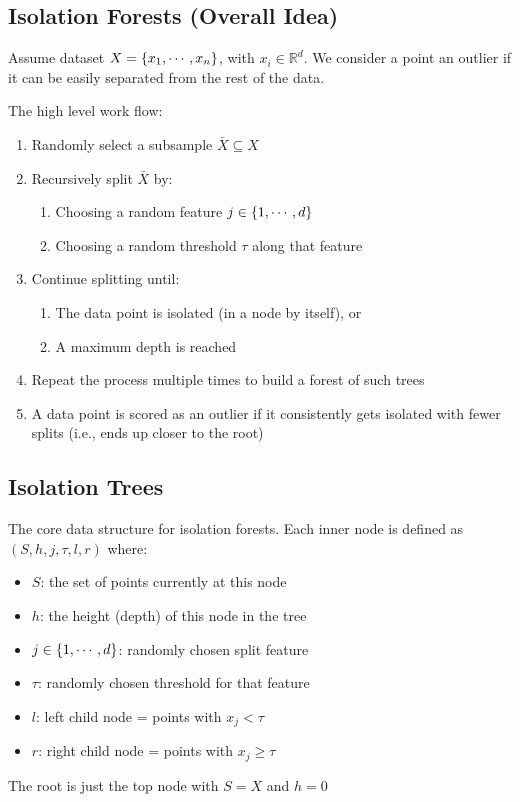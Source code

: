 \documentclass{article}
\begin{document}
\subsection*{Isolation Forests (Overall Idea)}
Assume dataset $X = \{x_1, \cdots, x_n\}$, with $x_i \in \mathbb{R}^d$. We consider a point an outlier if it can be easily separated from the rest of the data.

The high level work flow:
\begin{enumerate}
    \item Randomly select a subsample $\bar{X} \subseteq X$
    \item Recursively split $\bar{X}$ by:
    \begin{enumerate}
        \item Choosing a random feature $j \in \{1, \cdots, d\}$
        \item Choosing a random threshold $\tau$ along that feature
    \end{enumerate}
    \item Continue splitting until:
    \begin{enumerate}
        \item The data point is isolated (in a node by itself), or
        \item A maximum depth is reached
    \end{enumerate}
    \item Repeat the process multiple times to build a forest of such trees
    \item A data point is scored as an outlier if it consistently gets isolated with fewer splits (i.e., ends up closer to the root)
\end{enumerate}

\subsection*{Isolation Trees}
The core data structure for isolation forests. Each inner node is defined as $(S,h, j, \tau, l, r)$ where:
\begin{itemize}
    \item $S$: the set of points currently at this node
    \item $h$: the height (depth) of this node in the tree
    \item $j \in \{1, \cdots, d\}$: randomly chosen split feature
    \item $\tau$: randomly chosen threshold for that feature
    \item $l$: left child node = points with $x_j < \tau$
    \item $r$: right child node = points with $x_j \geq \tau$
\end{itemize}
The root is just the top node with $S = X$ and $h=0$
\end{document}
